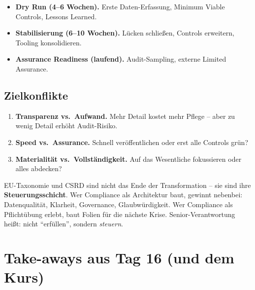 \documentclass[11pt,a4paper,oneside]{article}
\begin{document}
\begin{itemize}
  \item \textbf{Dry Run (4--6 Wochen).} Erste Daten-Erfassung, Minimum Viable Controls, Lessons Learned.
  \item \textbf{Stabilisierung (6--10 Wochen).} Lücken schließen, Controls erweitern, Tooling konsolidieren.
  \item \textbf{Assurance Readiness (laufend).} Audit-Sampling, externe Limited Assurance.
\end{itemize}

\subsection{Zielkonflikte}

\begin{enumerate}
  \item \textbf{Transparenz vs.\ Aufwand.} Mehr Detail kostet mehr Pflege -- aber zu wenig Detail erhöht Audit-Risiko.
  \item \textbf{Speed vs.\ Assurance.} Schnell veröffentlichen oder erst alle Controls grün?
  \item \textbf{Materialität vs.\ Vollständigkeit.} Auf das Wesentliche fokussieren oder alles abdecken?
\end{enumerate}

\begin{merkbox}
EU-Taxonomie und CSRD sind nicht das Ende der Transformation -- sie sind ihre \textbf{Steuerungsschicht}. Wer Compliance als Architektur baut, gewinnt nebenbei: Datenqualität, Klarheit, Governance, Glaubwürdigkeit. Wer Compliance als Pflichtübung erlebt, baut Folien für die nächste Krise. Senior-Verantwortung heißt: nicht ``erfüllen'', sondern \emph{steuern}.
\end{merkbox}

\section{Take-aways aus Tag 16 (und dem Kurs)}
\end{document}

